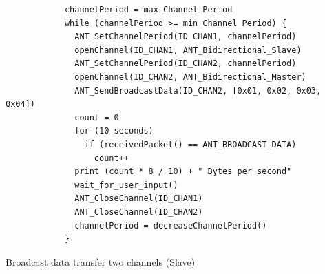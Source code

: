 \begin{description}
		\begin{code}[H]
			\begin{verbatim}
			channelPeriod = max_Channel_Period
			while (channelPeriod >= min_Channel_Period) {
			  ANT_SetChannelPeriod(ID_CHAN1, channelPeriod)
			  openChannel(ID_CHAN1, ANT_Bidirectional_Slave)
			  ANT_SetChannelPeriod(ID_CHAN2, channelPeriod)
			  openChannel(ID_CHAN2, ANT_Bidirectional_Master)
			  ANT_SendBroadcastData(ID_CHAN2, [0x01, 0x02, 0x03, 0x04])
			  count = 0
			  for (10 seconds) 
			    if (receivedPacket() == ANT_BROADCAST_DATA)
			      count++			
 			  print (count * 8 / 10) + " Bytes per second"
			  wait_for_user_input()
			  ANT_CloseChannel(ID_CHAN1)
			  ANT_CloseChannel(ID_CHAN2)
			  channelPeriod = decreaseChannelPeriod()
			}
			\end{verbatim}
			\caption{Broadcast data transfer two channels (Slave)}\label{lst:mExp2}
		\end{code}
 

\end{description}
